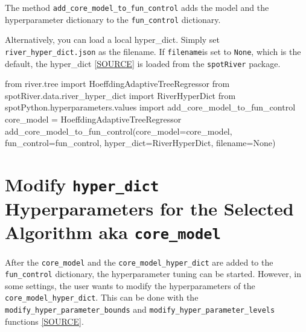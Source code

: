 \documentclass[
  letterpaper,
  DIV=11,
  numbers=noendperiod]{scrreprt}
\newenvironment{Shaded}{\begin{snugshade}}{\end{snugshade}}
\newcommand{\ImportTok}[1]{\textcolor[rgb]{0.00,0.46,0.62}{#1}}
\newcommand{\NormalTok}[1]{\textcolor[rgb]{0.00,0.23,0.31}{#1}}
\newcommand{\OperatorTok}[1]{\textcolor[rgb]{0.37,0.37,0.37}{#1}}
\newcommand{\VariableTok}[1]{\textcolor[rgb]{0.07,0.07,0.07}{#1}}
\begin{document}
The method \texttt{add\_core\_model\_to\_fun\_control} adds the model
and the hyperparameter dictionary to the \texttt{fun\_control}
dictionary.

Alternatively, you can load a local hyper\_dict. Simply set
\texttt{river\_hyper\_dict.json} as the filename. If \texttt{filename}is
set to \texttt{None}, which is the default, the hyper\_dict
\href{https://github.com/sequential-parameter-optimization/spotRiver/blob/main/src/spotRiver/data/river_hyper_dict.json}{{[}SOURCE{]}}
is loaded from the \texttt{spotRiver} package.

\begin{Shaded}
\begin{Highlighting}[]
\ImportTok{from}\NormalTok{ river.tree }\ImportTok{import}\NormalTok{ HoeffdingAdaptiveTreeRegressor}
\ImportTok{from}\NormalTok{ spotRiver.data.river\_hyper\_dict }\ImportTok{import}\NormalTok{ RiverHyperDict}
\ImportTok{from}\NormalTok{ spotPython.hyperparameters.values }\ImportTok{import}\NormalTok{ add\_core\_model\_to\_fun\_control}
\NormalTok{core\_model  }\OperatorTok{=}\NormalTok{ HoeffdingAdaptiveTreeRegressor}
\NormalTok{add\_core\_model\_to\_fun\_control(core\_model}\OperatorTok{=}\NormalTok{core\_model,}
\NormalTok{                              fun\_control}\OperatorTok{=}\NormalTok{fun\_control,}
\NormalTok{                              hyper\_dict}\OperatorTok{=}\NormalTok{RiverHyperDict,}
\NormalTok{                              filename}\OperatorTok{=}\VariableTok{None}\NormalTok{)}
\end{Highlighting}
\end{Shaded}

\section{\texorpdfstring{Modify \texttt{hyper\_dict} Hyperparameters for
the Selected Algorithm aka
\texttt{core\_model}}{Modify hyper\_dict Hyperparameters for the Selected Algorithm aka core\_model}}\label{modify-hyper_dict-hyperparameters-for-the-selected-algorithm-aka-core_model}

After the \texttt{core\_model} and the \texttt{core\_model\_hyper\_dict}
are added to the \texttt{fun\_control} dictionary, the hyperparameter
tuning can be started. However, in some settings, the user wants to
modify the hyperparameters of the \texttt{core\_model\_hyper\_dict}.
This can be done with the \texttt{modify\_hyper\_parameter\_bounds} and
\texttt{modify\_hyper\_parameter\_levels} functions
\href{https://github.com/sequential-parameter-optimization/spotPython/blob/main/src/spotPython/hyperparameters/values.py}{{[}SOURCE{]}}.
\end{document}
